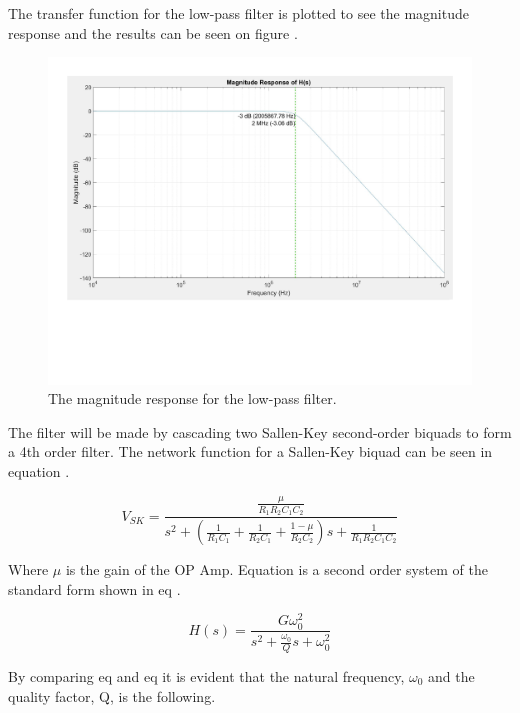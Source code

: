 The transfer function for the low-pass filter is plotted to see the magnitude response and the results can be seen on figure .
\begin{figure}[H]
    \centering
    \includegraphics[clip, trim=0 150 0 0, width=1\textwidth]{Sections/7_SystemDesign/Figures/7_2_4_AAFILT_HS.pdf}
    \caption{The magnitude response for the low-pass filter.}
    \label{fig_7_1_4_MAGRESP}
\end{figure}

The filter will be made by cascading two Sallen-Key second-order biquads to form a 4th order filter. The network function for a Sallen-Key biquad can be seen in equation  \cite{ANALOGFILTERS}.

\begin{equation}\label{eq:7_1_4_SallenKeyTF}
    V_{SK} = \frac{  \frac{\mu}{R_1R_2C_1C_2}}{s^2 + (\frac{1}{R_1C_1} + \frac{1}{R_2C_1} + \frac{1 - \mu}{R_2C_2})s + \frac{1}{R_1R_2C_1C_2}}
\end{equation}

Where $\mu$ is the gain of the OP Amp. Equation  is a second order system of the standard form shown in eq .

\begin{equation}\label{eq:7_1_4_SecondOrderSystem}
   H(s) = \frac{G\omega_0^2}{s^2 + \frac{\omega_0}{Q}s + \omega_0^2}
\end{equation}

By comparing eq  and eq  it is evident that the natural frequency, $\omega_0$ and the quality factor, Q, is the following.

